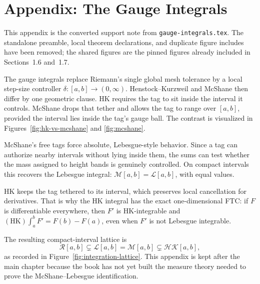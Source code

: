 \section*{Appendix: The Gauge Integrals}

\begin{remark*}
This appendix is the converted support note from \texttt{gauge-integrals.tex}.
The standalone preamble, local theorem declarations, and duplicate figure
includes have been removed; the shared figures are the pinned figures already
included in Sections~1.6 and~1.7.
\end{remark*}

\begin{remark*}
The gauge integrals replace Riemann's single global mesh tolerance by a local
step-size controller \(\delta:[a,b]\to(0,\infty)\). Henstock--Kurzweil and
McShane then differ by one geometric clause. HK requires the tag to sit inside
the interval it controls. McShane drops that tether and allows the tag to
range over \([a,b]\), provided the interval lies inside the tag's gauge ball.
The contrast is visualized in Figures~\ref{fig:hk-vs-mcshane} and
\ref{fig:mcshane}.
\end{remark*}

\begin{remark*}
McShane's free tags force absolute, Lebesgue-style behavior. Since a tag can
authorize nearby intervals without lying inside them, the sums can test
whether the mass assigned to height bands is genuinely controlled. On compact
intervals this recovers the Lebesgue integral: \(\mathcal M[a,b]=\mathcal
L[a,b]\), with equal values.
\end{remark*}

\begin{remark*}
HK keeps the tag tethered to its interval, which preserves local cancellation
for derivatives. That is why the HK integral has the exact one-dimensional
FTC: if \(F\) is differentiable everywhere, then \(F'\) is HK-integrable and
\((\mathrm{HK})\int_a^b F'=F(b)-F(a)\), even when \(F'\) is not Lebesgue
integrable.
\end{remark*}

\begin{remark*}[Lattice]
The resulting compact-interval lattice is
\[
  \mathcal R[a,b]\subsetneq \mathcal L[a,b]=\mathcal M[a,b]
  \subsetneq \mathcal{HK}[a,b],
\]
as recorded in Figure~\ref{fig:integration-lattice}. This appendix is kept
after the main chapter because the book has not yet built the measure theory
needed to prove the McShane--Lebesgue identification.
\end{remark*}
